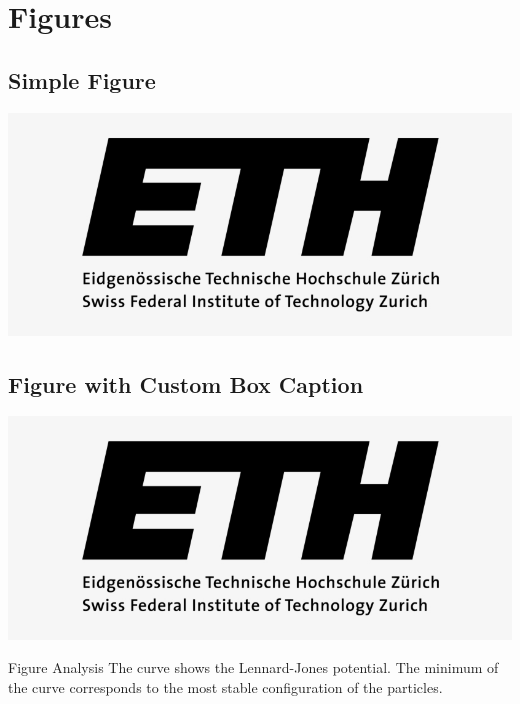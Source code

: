 \begingroup
\raggedright
\section{Figures}


\subsection{Simple Figure}
    \centering
    \includegraphics[width=0.9\linewidth]{figures/example.png}


\subsection{Figure with Custom Box Caption}
\begin{minipage}{\linewidth}
    \centering
    \includegraphics[width=0.9\linewidth]{figures/example.png}
    \begin{topicbox}{Figure Analysis}
        The curve shows the Lennard-Jones potential. The minimum of the curve corresponds to the most stable configuration of the particles.
    \end{topicbox}
\end{minipage}


\endgroup
